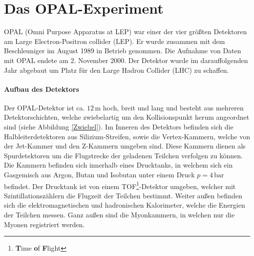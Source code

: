 \section{Das OPAL-Experiment}

OPAL (Omni Purpose Apparatus at LEP) war einer der vier größten Detektoren am Large Electron-Positron collider (LEP). Er wurde zusammen mit dem Beschleuniger im August 1989 in Betrieb genommen. Die Aufnahme von Daten mit OPAL endete am 2. November 2000. Der Detektor wurde im darauffolgenden Jahr abgebaut um Platz für den Large Hadron Collider (LHC) zu schaffen.\\


 

\paragraph{Aufbau des Detektors}
Der OPAL-Detektor ist ca. $12\,\mathrm{m}$ hoch, breit und lang und besteht aus mehreren Detektorschichten, welche zwiebelartig um den Kollisionspunkt herum angeordnet sind (siehe Abbildung \ref{Zwiebel}). Im Inneren des Detektors befinden sich die Halbleiterdetektoren aus Silizium-Streifen, sowie die Vertex-Kammern, welche von der Jet-Kammer und den Z-Kammern umgeben sind. Diese Kammern dienen als Spurdetektoren um die Flugstrecke der geladenen Teilchen verfolgen zu können. Die Kammern befinden sich innerhalb eines Drucktanks, in welchem sich ein Gasgemisch aus Argon, Butan und Isobutan unter einem Druck $p=4\,\mathrm{bar}$ befindet. Der Drucktank ist von einem TOF\footnote{\textbf Time \textbf of \textbf Flight}-Detektor umgeben, welcher mit Szintillationszählern die Flugzeit der Teilchen bestimmt. Weiter außen befinden sich die elektromagnetischen und hadronischen Kalorimeter, welche die Energien der Teilchen messen. Ganz außen sind die Myonkammern, in welchen nur die Myonen registriert werden. \cite{anleitungalt}

